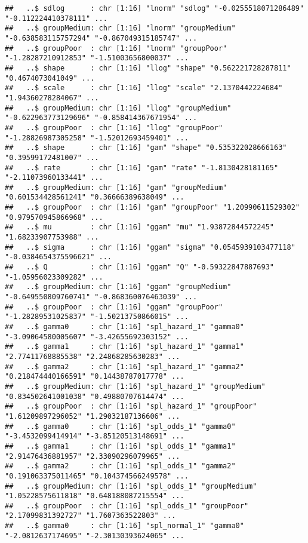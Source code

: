 \documentclass[
]{article}
\begin{document}
\begin{verbatim}
##   ..$ sdlog      : chr [1:16] "lnorm" "sdlog" "-0.0255518071286489" "-0.112224410378111" ...
##   ..$ groupMedium: chr [1:16] "lnorm" "groupMedium" "-0.638583115757294" "-0.867049315185747" ...
##   ..$ groupPoor  : chr [1:16] "lnorm" "groupPoor" "-1.28287210912853" "-1.51003656800037" ...
##   ..$ shape      : chr [1:16] "llog" "shape" "0.562221728287811" "0.4674073041049" ...
##   ..$ scale      : chr [1:16] "llog" "scale" "2.1370442224684" "1.94360278284067" ...
##   ..$ groupMedium: chr [1:16] "llog" "groupMedium" "-0.622963773129696" "-0.858414367671954" ...
##   ..$ groupPoor  : chr [1:16] "llog" "groupPoor" "-1.28826987305258" "-1.52012693459401" ...
##   ..$ shape      : chr [1:16] "gam" "shape" "0.535322028666163" "0.39599172481007" ...
##   ..$ rate       : chr [1:16] "gam" "rate" "-1.8130428181165" "-2.11073960133441" ...
##   ..$ groupMedium: chr [1:16] "gam" "groupMedium" "0.601534428561241" "0.36666389638049" ...
##   ..$ groupPoor  : chr [1:16] "gam" "groupPoor" "1.20990611529302" "0.979570945866968" ...
##   ..$ mu         : chr [1:16] "ggam" "mu" "1.93872844572245" "1.68233907753988" ...
##   ..$ sigma      : chr [1:16] "ggam" "sigma" "0.0545939103477118" "-0.0384654375596621" ...
##   ..$ Q          : chr [1:16] "ggam" "Q" "-0.59322847887693" "-1.05956023309282" ...
##   ..$ groupMedium: chr [1:16] "ggam" "groupMedium" "-0.649550809760741" "-0.868360076463039" ...
##   ..$ groupPoor  : chr [1:16] "ggam" "groupPoor" "-1.28289531025837" "-1.50213750866015" ...
##   ..$ gamma0     : chr [1:16] "spl_hazard_1" "gamma0" "-3.09064580005607" "-3.42655692303152" ...
##   ..$ gamma1     : chr [1:16] "spl_hazard_1" "gamma1" "2.77411768885538" "2.24868285630283" ...
##   ..$ gamma2     : chr [1:16] "spl_hazard_1" "gamma2" "0.218474440166591" "0.14438787017778" ...
##   ..$ groupMedium: chr [1:16] "spl_hazard_1" "groupMedium" "0.834502641001038" "0.49880707614474" ...
##   ..$ groupPoor  : chr [1:16] "spl_hazard_1" "groupPoor" "1.61209897296052" "1.29032187136606" ...
##   ..$ gamma0     : chr [1:16] "spl_odds_1" "gamma0" "-3.4532099414914" "-3.85120513148691" ...
##   ..$ gamma1     : chr [1:16] "spl_odds_1" "gamma1" "2.91476436881957" "2.33090296079965" ...
##   ..$ gamma2     : chr [1:16] "spl_odds_1" "gamma2" "0.191063375011465" "0.104374566249578" ...
##   ..$ groupMedium: chr [1:16] "spl_odds_1" "groupMedium" "1.05228575611818" "0.648188087215554" ...
##   ..$ groupPoor  : chr [1:16] "spl_odds_1" "groupPoor" "2.17099831392727" "1.7607363522803" ...
##   ..$ gamma0     : chr [1:16] "spl_normal_1" "gamma0" "-2.0812637174695" "-2.30130393624065" ...

\end{verbatim}
\end{document}
